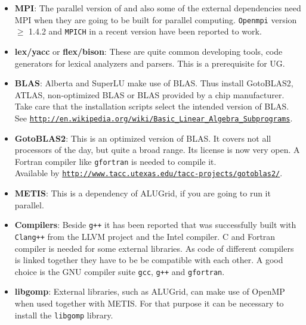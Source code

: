 \begin{itemize}
\item \textbf{MPI}: The parallel version of \Dune and also some of the external dependencies need MPI when they are going to be built for parallel computing. \texttt{Openmpi} version $\geqslant$ 1.4.2 and \texttt{MPICH} in a recent version have been reported to work. 

\item \textbf{lex/yacc} or \textbf{flex/bison}: These are quite common developing tools, code generators for lexical analyzers and parsers. This is a prerequisite for UG.

\item \textbf{BLAS}: Alberta and SuperLU make use of BLAS. Thus install GotoBLAS2, ATLAS, non-optimized BLAS or BLAS provided by a chip manufacturer. Take care that the installation scripts select the intended version of BLAS. See \texttt{\url{http://en.wikipedia.org/wiki/Basic_Linear_Algebra_Subprograms}}.

\item \textbf{GotoBLAS2}: This is an optimized version of BLAS. It covers not  all processors of the day, but quite a broad range. Its license is now very open.  A Fortran compiler like \texttt{gfortran} is needed to compile it.\\
Available by \texttt{\url{http://www.tacc.utexas.edu/tacc-projects/gotoblas2/}}.

\item \textbf{METIS}: This is a dependency of ALUGrid, if you are going to run it parallel.

\item \textbf{Compilers}: Beside \texttt{g++} it has been reported that \Dune was successfully built with \texttt{Clang++} from the LLVM project and the Intel \Cplusplus compiler. 
C and Fortran compiler is needed for some external libraries. As code of different compilers is linked together they have to be be compatible with each other. A good choice is the GNU compiler suite \texttt{gcc}, \texttt{g++} and \texttt{gfortran}.

\item \textbf{libgomp}: External libraries, such as ALUGrid, can make use of OpenMP when used together with METIS. For that purpose it can be necessary to install the \texttt{libgomp} library.

\end{itemize}

